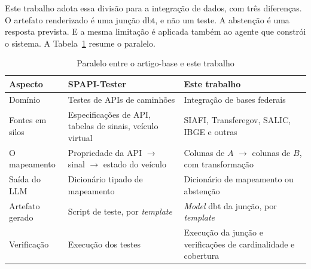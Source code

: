 Este trabalho adota essa divisão para a integração de dados, com três
diferenças. O artefato renderizado é uma junção dbt, e não um teste. A
abstenção é uma resposta prevista. E a mesma limitação é aplicada também ao
agente que constrói o sistema. A Tabela~\ref{tab:artigo-base} resume o
paralelo.

\begin{table}[htbp]
\centering
\caption{Paralelo entre o artigo-base e este trabalho}
\label{tab:artigo-base}
\footnotesize
\begin{tabularx}{\textwidth}{@{}l>{\raggedright\arraybackslash}X>{\raggedright\arraybackslash}X@{}}
\toprule
\textbf{Aspecto} & \textbf{SPAPI-Tester} & \textbf{Este trabalho} \\
\midrule
Domínio & Testes de APIs de caminhões & Integração de bases federais \\
Fontes em silos & Especificações de API, tabelas de sinais, veículo virtual & SIAFI, Transferegov, SALIC, IBGE e outras \\
O mapeamento & Propriedade da API $\rightarrow$ sinal $\rightarrow$ estado do veículo & Colunas de $A$ $\rightarrow$ colunas de $B$, com transformação \\
Saída do LLM & Dicionário tipado de mapeamento & Dicionário de mapeamento ou abstenção \\
Artefato gerado & Script de teste, por \emph{template} & \emph{Model} dbt da junção, por \emph{template} \\
Verificação & Execução dos testes & Execução da junção e verificações de cardinalidade e cobertura \\
\bottomrule
\end{tabularx}
\end{table}
